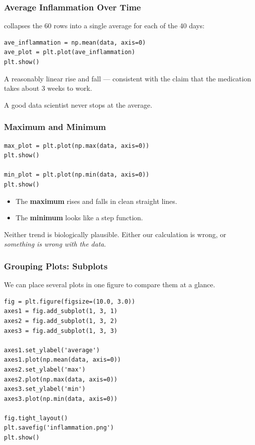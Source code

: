 \documentclass{beamer}
\begin{document}
\begin{frame}[fragile]
    \frametitle{Average Inflammation Over Time}
     collapses the 60 rows into a single
    average for each of the 40 days:
    \begin{lstlisting}[style=demo]
ave_inflammation = np.mean(data, axis=0)
ave_plot = plt.plot(ave_inflammation)
plt.show()
    \end{lstlisting}

    A reasonably linear rise and fall --- consistent with the claim that
    the medication takes about 3 weeks to work.

    \bigskip

    A good data scientist never stops at the average.
\end{frame}

\begin{frame}[fragile]
    \frametitle{Maximum and Minimum}
    \begin{lstlisting}[style=demo]
max_plot = plt.plot(np.max(data, axis=0))
plt.show()

min_plot = plt.plot(np.min(data, axis=0))
plt.show()
    \end{lstlisting}

    \begin{itemize}
        \item The \textbf{maximum} rises and falls in clean straight lines.
        \item The \textbf{minimum} looks like a step function.
    \end{itemize}

    Neither trend is biologically plausible. Either our calculation is
    wrong, or \emph{something is wrong with the data}.
\end{frame}

\begin{frame}[fragile]
    \frametitle{Grouping Plots: Subplots}
    We can place several plots in one figure to compare them at a glance.
    \begin{lstlisting}[style=demo]
fig = plt.figure(figsize=(10.0, 3.0))
axes1 = fig.add_subplot(1, 3, 1)
axes2 = fig.add_subplot(1, 3, 2)
axes3 = fig.add_subplot(1, 3, 3)

axes1.set_ylabel('average')
axes1.plot(np.mean(data, axis=0))
axes2.set_ylabel('max')
axes2.plot(np.max(data, axis=0))
axes3.set_ylabel('min')
axes3.plot(np.min(data, axis=0))

fig.tight_layout()
plt.savefig('inflammation.png')
plt.show()
    \end{lstlisting}
\end{frame}
\end{document}
